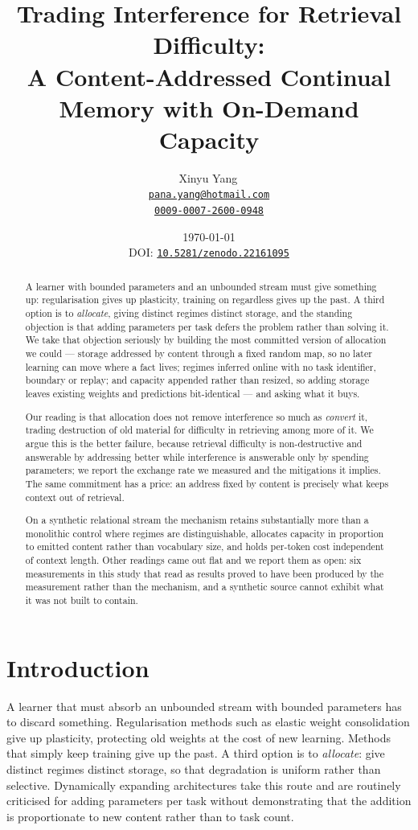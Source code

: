 \documentclass[11pt,a4paper]{article}
\title{Trading Interference for Retrieval Difficulty:\\
{\large A Content-Addressed Continual Memory with On-Demand Capacity}}
\author{%
  Xinyu Yang\,\orcidlink{0009-0007-2600-0948}\\
  \href{mailto:pana.yang@hotmail.com}{\texttt{pana.yang@hotmail.com}}\\
  \href{https://orcid.org/0009-0007-2600-0948}{\texttt{0009-0007-2600-0948}}
}
\date{%
  \today\\[2pt]
  \normalsize DOI:
  \href{https://doi.org/10.5281/zenodo.22161095}{\texttt{10.5281/zenodo.22161095}}%
}
\begin{document}
\maketitle

\begin{abstract}
A learner with bounded parameters and an unbounded stream must give something
up: regularisation gives up plasticity, training on regardless gives up the
past. A third option is to \emph{allocate}, giving distinct regimes distinct
storage, and the standing objection is that adding parameters per task defers
the problem rather than solving it. We take that objection seriously by
building the most committed version of allocation we could --- storage
addressed by content through a fixed random map, so no later learning can move
where a fact lives; regimes inferred online with no task identifier, boundary
or replay; and capacity appended rather than resized, so adding storage leaves
existing weights and predictions bit-identical --- and asking what it buys.

Our reading is that allocation does not remove interference so much as
\emph{convert} it, trading destruction of old material for difficulty in
retrieving among more of it. We argue this is the better failure, because
retrieval difficulty is non-destructive and answerable by addressing better
while interference is answerable only by spending parameters; we report the
exchange rate we measured and the mitigations it implies. The same commitment
has a price: an address fixed by content is precisely what keeps context out of
retrieval.

On a synthetic relational stream the mechanism retains substantially more than
a monolithic control where regimes are distinguishable, allocates capacity in
proportion to emitted content rather than vocabulary size, and holds per-token
cost independent of context length. Other readings came out flat and we report
them as open: six measurements in this study that read as results proved to
have been produced by the measurement rather than the mechanism, and a
synthetic source cannot exhibit what it was not built to contain.
\end{abstract}

\section{Introduction}

A learner that must absorb an unbounded stream with bounded parameters has to
discard something. Regularisation methods such as elastic weight consolidation
\citep{kirkpatrick2017overcoming} give up plasticity, protecting old weights at
the cost of new learning. Methods that simply keep training give up the past.
A third option is to \emph{allocate}: give distinct regimes distinct storage, so
that degradation is uniform rather than selective. Dynamically expanding
architectures \citep{rusu2016progressive,yoon2018lifelong} take this route and
are routinely criticised for adding parameters per task without demonstrating
that the addition is proportionate to new content rather than to task count.
\end{document}
